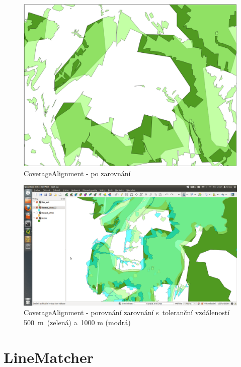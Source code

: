  \begin{figure}[H]
    \centering
      \includegraphics[width=360pt]{./pictures/test-ca3.pdf}
      \caption{CoverageAlignment - po zarovnání}
      \label{fig:ca3}
  \end{figure}

  \begin{figure}[H]
    \centering
      \includegraphics[width=400pt]{./pictures/test-ca4.png}
      \caption[CoverageAlignment- porovnání]{CoverageAlignment 
	- porovnání zarovnání s~toleranční vzdáleností 500~m~(zelená)
	a~1000 m (modrá)}
      \label{fig:ca4}
  \end{figure}

\section{LineMatcher}
\label{ukazky-lm}

